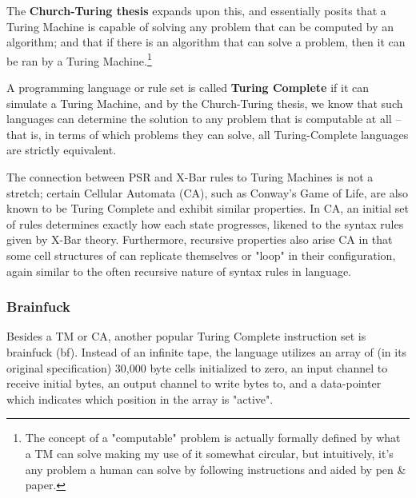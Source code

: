 \documentclass[runningheads]{llncs}
\begin{document}
The \textbf{Church-Turing thesis}\cite{kleene1952}
expands upon this, and essentially posits that a Turing Machine is capable of solving any problem that can be computed by an algorithm; and that if there is an algorithm that can solve a problem, then it can be ran by a Turing Machine.\footnote{The concept of a "computable" problem is actually formally defined by what a TM can solve making my use of it somewhat circular, but intuitively, it's any problem a human can solve by following instructions and aided by pen \& paper.}

A programming language or rule set is called \textbf{Turing Complete} if it can simulate a Turing Machine, and by the Church-Turing thesis, we know that such languages can determine the solution to any problem that is computable at all -- that is, in terms of which problems they can solve, all Turing-Complete languages are strictly equivalent.

The connection between PSR and X-Bar rules to Turing Machines is not a stretch; certain Cellular Automata (CA), such as Conway's Game of Life, are also known to be Turing Complete and exhibit similar properties.\cite{berlekamp2001}
In CA, an initial set of rules determines exactly how each state progresses, likened to the syntax rules given by X-Bar theory. Furthermore, recursive properties also arise CA in that some cell structures of can replicate themselves or "loop" in their configuration, again similar to the often recursive nature of syntax rules in language.

\subsubsection{Brainfuck}
Besides a TM or CA, another popular Turing Complete instruction set is brainfuck (bf). Instead of an infinite tape, the language utilizes an array of (in its original specification) 30,000 byte cells initialized to zero, an input channel to receive initial bytes, an output channel to write bytes to, and a data-pointer which indicates which position in the array is "active".
\end{document}
